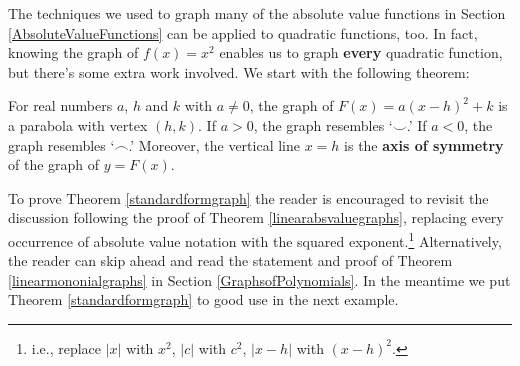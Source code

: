 \documentclass{ximera}
\begin{document}
\medskip

The techniques we used to graph many of the absolute value functions in Section \ref{AbsoluteValueFunctions} can be applied to quadratic functions, too.  In fact, knowing the graph of $f(x) = x^2$ enables us to graph \textbf{every} quadratic function, but there's some extra work involved.  We start with the following theorem:

\medskip

\colorbox{ResultColor}{\bbm

\begin{thm}  \label{standardformgraph}  For real numbers $a$, $h$ and $k$ with $a\neq 0$, the graph of  $F(x) = a(x-h)^2 + k$ is a parabola with vertex $(h,k)$.  If $a>0$, the graph resembles  `$\smile$.'  If $a<0$, the graph resembles `$\frown$.'  Moreover, the vertical line $x=h$ is the  \textbf{axis of symmetry} of the graph of $y = F(x)$.
\end{thm}
\ebm}

\medskip

To prove Theorem \ref{standardformgraph} the reader is encouraged to revisit the discussion following the proof of Theorem \ref{linearabsvaluegraphs}, replacing every occurrence of absolute value notation with the squared exponent.\footnote{i.e., replace $|x|$ with $x^2$, $|c|$ with $c^2$, $|x-h|$ with $(x-h)^2$.} Alternatively, the reader can skip ahead and read the statement and proof of Theorem \ref{linearmononialgraphs} in Section \ref{GraphsofPolynomials}.  In the meantime we put Theorem \ref{standardformgraph}  to good use in the next example.
\end{document}
